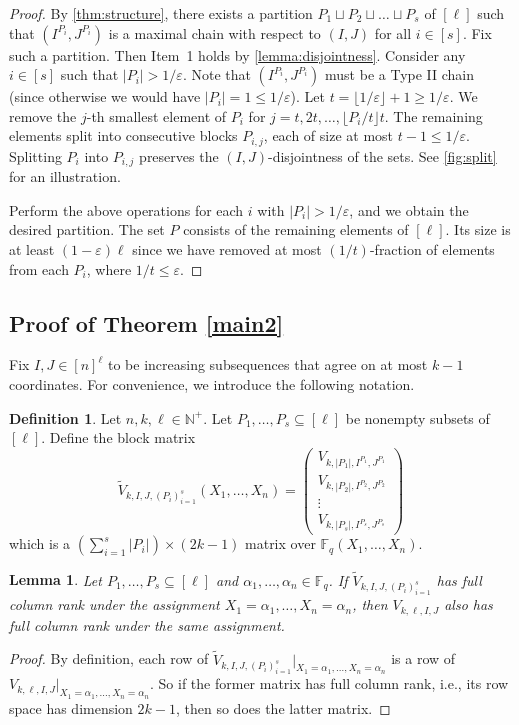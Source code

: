 \documentclass[11pt]{article}
\theoremstyle{plain}
\newtheorem{lemma}[thm]{Lemma}
\theoremstyle{definition}
\newtheorem{defn}[thm]{Definition}
\theoremstyle{remark}
\newcommand{\N}{\mathbb{N}}
\newcommand{\F}{\mathbb{F}}
\newcommand{\eps}{\varepsilon}
\begin{document}
\begin{proof}
By \cref{thm:structure}, there exists a partition $P_1\sqcup P_2\sqcup \dots\sqcup P_{s}$ of $[\ell]$ such that $(I^{P_i},J^{P_i})$ is a maximal chain with respect to $(I,J)$ for all $i\in[s]$. Fix such a partition.
Then Item~1 holds by \cref{lemma:disjointness}.
Consider any $i\in [s]$ such that $|P_i|>1/\eps$.
Note that $(I^{P_i},J^{P_i})$ must be a Type II chain (since otherwise we would have $|P_i|=1\leq 1/\eps$).
Let $t=\lfloor 1/\eps\rfloor+1\geq 1/\eps$.
We remove the $j$-th smallest element of $P_i$ for $j=t, 2t,\dots,\lfloor P_i/t\rfloor t$.
The remaining elements split into consecutive blocks $P_{i,j}$, each of size at most $t-1\leq 1/\eps$. 
Splitting $P_i$ into $P_{i,j}$ preserves the $(I,J)$-disjointness of the sets. See \cref{fig:split} for an illustration. 

Perform the above operations for each $i$ with $|P_i|>1/\eps$, and we obtain the desired partition. The set $P$ consists of the remaining elements of $[\ell]$. Its size is at least $(1-\eps)\ell$ since we have removed at most $(1/t)$-fraction of elements from each $P_i$, where $1/t\leq \eps$.
\end{proof}
\subsection{Proof of Theorem \ref{main2}}\label{sec:main}

Fix $I,J\in [n]^\ell$ to be increasing subsequences that agree on at most $k-1$ coordinates.
For convenience, we introduce the following notation.

\begin{defn}\label{defn:blocks}
Let $n,k,\ell\in\N^+$. Let $P_1,\dots,P_s\subseteq [\ell]$ be nonempty subsets of $[\ell]$.
Define the block matrix
\[
\widetilde{V}_{k,I,J,(P_i)_{i=1}^s}(X_1,\dots,X_n)=\begin{pmatrix}
    V_{k,|P_1|,I^{P_1},J^{P_1}}\\
    V_{k,|P_2|,I^{P_2},J^{P_2}}\\
    \vdots\\
    V_{k,|P_s|,I^{P_s},J^{P_s}}
\end{pmatrix}
\]
which is a $\left(\sum_{i=1}^s |P_i|\right) \times (2k-1)$ matrix over $\F_q(X_1,\dots,X_n)$.
\end{defn}
\begin{lemma}\label{lem:submatrix}
Let $P_1,\dots,P_s\subseteq [\ell]$ and $\alpha_1,\dots,\alpha_n\in\F_q$.
If $\widetilde{V}_{k,I,J,(P_i)_{i=1}^s}$ has full column rank under the assignment $X_1=\alpha_1,\dots,X_n=\alpha_n$, then $V_{k,\ell,I,J}$ also has full column rank under the same assignment.
\end{lemma}
\begin{proof}
By definition, each row of $\widetilde{V}_{k,I,J,(P_i)_{i=1}^s}|_{X_1=\alpha_1,\dots,X_n=\alpha_n}$ is a row of $V_{k,\ell,I,J}|_{X_1=\alpha_1,\dots,X_n=\alpha_n}$.
So if the former matrix has full column rank, i.e., its row space has dimension $2k-1$, then so does the latter matrix. 
\end{proof}
\end{document}
